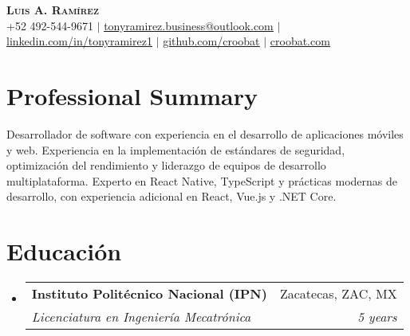 \documentclass[letterpaper,11pt]{article}
\makeatletter
\newcommand{\resumeSubheading}[4]{
  \vspace{4pt}\item
    \begin{tabular*}{0.97\textwidth}[t]{l@{\extracolsep{\fill}}r}
      \textbf{#1} & #2 \\
      \textit{\small#3} & \textit{\small #4} \\
    \end{tabular*}\vspace{-2pt}
}
\newcommand{\resumeSubHeadingListStart}{\begin{itemize}[leftmargin=0.15in, label={}]}
\newcommand{\resumeSubHeadingListEnd}{\end{itemize}}
\makeatother
\begin{document}
\begin{center}
    \textbf{\Huge \scshape Luis A. Ramírez} \\ \vspace{1pt}
    \small +52 492-544-9671 $|$ \href{tonyramirez.business@outlook.com}{\underline{tonyramirez.business@outlook.com}} $|$
    \href{https://linkedin.com/in/tonyramirez1}{\underline{linkedin.com/in/tonyramirez1}} $|$
    \href{https://github.com/croobat}{\underline{github.com/croobat}} $|$
		\href{https://croobat.com}{\underline{croobat.com}}
\end{center}

\section{Professional Summary}
\begin{itemize}[leftmargin=0.15in, label={}]
\small{
\item{Desarrollador de software con experiencia en el desarrollo de aplicaciones móviles y web. Experiencia en la implementación de estándares de seguridad, optimización del rendimiento y liderazgo de equipos de desarrollo multiplataforma. Experto en React Native, TypeScript y prácticas modernas de desarrollo, con experiencia adicional en React, Vue.js y .NET Core.}
}
\end{itemize}

\section{Educación}
  \resumeSubHeadingListStart
    \resumeSubheading
      {Instituto Politécnico Nacional (IPN)}{Zacatecas, ZAC, MX}
      {Licenciatura en Ingeniería Mecatrónica}{5 years}
  \resumeSubHeadingListEnd


\end{document}
